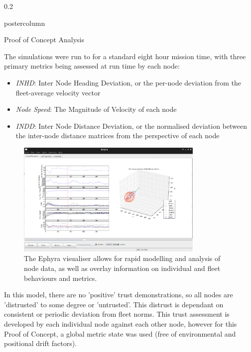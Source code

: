 \documentclass[final,hyperref={pdfpagelabels=false}]{beamer}
\def\colwidth{0.2\linewidth}
\begin{document}
\begin{frame}[fragile]
\begin{columns}[T]
\begin{column}{\colwidth}
\begin{beamercolorbox}[center,wd=\textwidth]{postercolumn}
\begin{minipage}[T]{.98\textwidth}
{\begin{block}{Proof of Concept Analysis}
            
            The simulations were run to for a standard eight hour mission time, with three primary metrics being assessed at run time by each node:
            \begin{itemize}
              \item \emph{INHD}: Inter Node Heading Deviation, or the per-node deviation from the fleet-average velocity vector
              \item \emph{Node Speed}: The Magnitude of Velocity of each node
              \item \emph{INDD}: Inter Node Distance Deviation, or the normalised deviation between the inter-node distance matrices from the perspective of each node
            \end{itemize}
            \begin{figure}
              \includegraphics[width=0.8\textwidth]{figures/ephyra_vis}
              \caption{The Ephyra visualiser allows for rapid modelling and analysis of node data, as well as overlay information on individual and fleet behaviours and metrics.}
              \label{fig:Ephyra}
            \end{figure}
            In this model, there are no 'positive' trust demonstrations, so all nodes are 'distrusted' to some degree or 'untrusted'. This distrust is dependant on consistent or periodic deviation from fleet norms. This trust assessment is developed by each individual node against each other node, however for this Proof of Concept, a global metric state was used (free of environmental and positional drift factors).

            \end{block}

          }
          \end{minipage}
        \end{beamercolorbox}
      \end{column}


\end{columns}
\end{frame}
\end{document}
